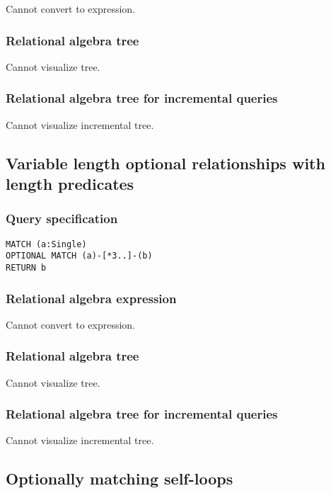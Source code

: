 Cannot convert to expression.

\subsubsection*{Relational algebra tree}

Cannot visualize tree.

\subsubsection*{Relational algebra tree for incremental queries}

Cannot visualize incremental tree.

\subsection{Variable length optional relationships with length predicates}

\subsubsection*{Query specification}

\begin{lstlisting}
MATCH (a:Single)
OPTIONAL MATCH (a)-[*3..]-(b)
RETURN b
\end{lstlisting}

\subsubsection*{Relational algebra expression}

Cannot convert to expression.

\subsubsection*{Relational algebra tree}

Cannot visualize tree.

\subsubsection*{Relational algebra tree for incremental queries}

Cannot visualize incremental tree.

\subsection{Optionally matching self-loops}

